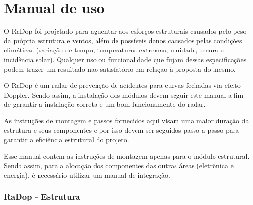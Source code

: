 

\chapter{Manual de uso}

        
        
         O RaDop foi projetado para aguentar aos esforços estruturais causados pelo peso da própria estrutura e ventos, além de possíveis danos causados pelas condições climáticas (variação de tempo, temperaturas extremas, umidade, secura e incidência solar). Qualquer uso ou funcionalidade que fujam dessas especificações podem trazer um resultado não satisfatório em relação à proposta do mesmo. 
    
        O RaDop é um radar de prevenção de acidentes para curvas fechadas via efeito Doppler. Sendo assim, a instalação dos módulos devem seguir este manual a fim de garantir a instalação correta e um bom funcionamento do radar. 
        
        As instruções de montagem e passos fornecidos aqui visam uma maior duração da estrutura e seus componentes e por isso devem ser seguidos passo a passo para garantir a eficiência estrutural do projeto.
        
        Esse manual contém as instruções de montagem apenas para o módulo estrutural. Sendo assim, para a alocação dos componentes das outras áreas (eletrônica e energia), é necessário utilizar um manual de integração.
        
        
        
        \subsection{RaDop - Estrutura}
        
